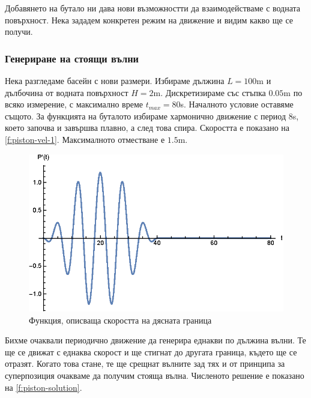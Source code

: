 \documentclass[12pt]{article}
\numberwithin{equation}{section}
\begin{document}
Добавянето на бутало ни дава нови възможностти да взаимодействаме с водната повърхност. Нека зададем конкретен режим на движение и видим какво ще се получи.

\subsubsection{Генериране на стоящи вълни}
Нека разгледаме басейн с нови размери. Избираме дължина $L=100$m и дълбочина от водната повърхност $H=2$m. Дискретизираме със стъпка $0.05$m по всяко измерение, с максимално време $t_{max}=80$s. Началното условие оставяме същото. За функцията на буталото избираме хармонично движение с период $8$s, което започва и завършва плавно, а след това спира. Скоростта е показано на \autoref{f:piston-vel-1}. Максималното отместване е $1.5$m.

\begin{figure}[h]
    \centering
    \includegraphics{figures/results/piston-vel-1.eps}
    \caption{Функция, описваща скоростта на дясната граница}
    \label{f:piston-vel-1}
\end{figure}

Бихме очаквали периодично движение да генерира еднакви по дължина вълни. Те ще се движат с еднаква скорост и ще стигнат до другата граница, където ще се отразят. Когато това стане, те ще срещнат вълните зад тях и от принципа за суперпозиция очакваме да получим стояща вълна. Численото решение е показано на \autoref{f:piston-solution}.
\end{document}

